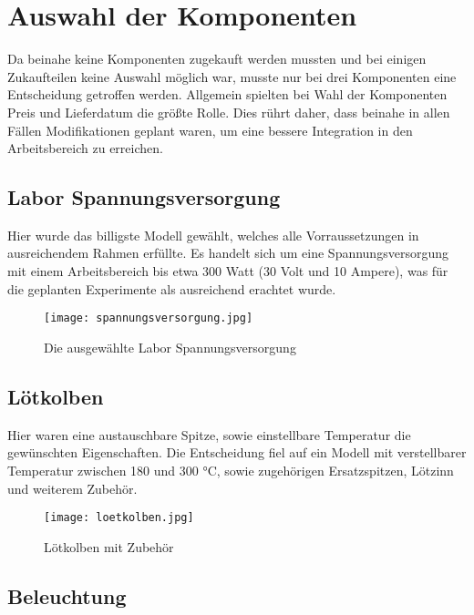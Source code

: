 \section{Auswahl der Komponenten}

Da beinahe keine Komponenten zugekauft werden mussten und bei einigen Zukaufteilen keine Auswahl möglich war, musste nur bei drei Komponenten eine Entscheidung getroffen werden.
Allgemein spielten bei Wahl der Komponenten Preis und Lieferdatum die größte Rolle.
Dies rührt daher, dass beinahe in allen Fällen Modifikationen geplant waren, um eine bessere Integration in den Arbeitsbereich zu erreichen.

\subsection{Labor Spannungsversorgung}

Hier wurde das billigste Modell gewählt, welches alle Vorraussetzungen in ausreichendem Rahmen erfüllte.
Es handelt sich um eine Spannungsversorgung mit einem Arbeitsbereich bis etwa 300 Watt (30 Volt und 10 Ampere), was für die geplanten Experimente als ausreichend erachtet wurde.

\begin{figure}[H]
    \begin{center}
        \texttt{[image: spannungsversorgung.jpg]}
        \caption{Die ausgewählte Labor Spannungsversorgung}
    \end{center}
\end{figure}

\subsection{Lötkolben}

Hier waren eine austauschbare Spitze, sowie einstellbare Temperatur die gewünschten Eigenschaften.
Die Entscheidung fiel auf ein Modell mit verstellbarer Temperatur zwischen 180 und 300 °C, sowie zugehörigen Ersatzspitzen, Lötzinn und weiterem Zubehör.

\begin{figure}[H]
    \begin{center}
        \texttt{[image: loetkolben.jpg]}
        \caption{Lötkolben mit Zubehör}
    \end{center}
\end{figure}

\subsection{Beleuchtung}


